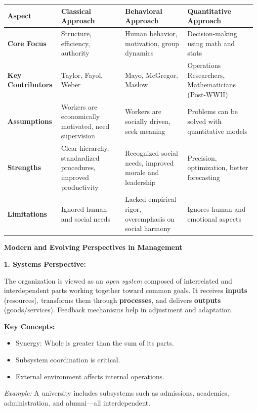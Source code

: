 \documentclass[12pt,a4paper]{book}
\begin{document}
\begin{tabular}{|p{4cm}|p{4cm}|p{4cm}|p{4cm}|}
\hline
\textbf{Aspect} & \textbf{Classical Approach} & \textbf{Behavioral Approach} & \textbf{Quantitative Approach} \\
\hline
\textbf{Core Focus} & Structure, efficiency, authority & Human behavior, motivation, group dynamics & Decision-making using math and stats \\
\hline
\textbf{Key Contributors} & Taylor, Fayol, Weber & Mayo, McGregor, Maslow & Operations Researchers, Mathematicians (Post-WWII) \\
\hline
\textbf{Assumptions} & Workers are economically motivated, need supervision & Workers are socially driven, seek meaning & Problems can be solved with quantitative models \\
\hline
\textbf{Strengths} & Clear hierarchy, standardized procedures, improved productivity & Recognized social needs, improved morale and leadership & Precision, optimization, better forecasting \\
\hline
\textbf{Limitations} & Ignored human and social needs & Lacked empirical rigor, overemphasis on social harmony & Ignores human and emotional aspects \\
\hline
\end{tabular}

\vspace{0.8cm}

\textbf{Modern and Evolving Perspectives in Management}

\textbf{1. Systems Perspective:}

The organization is viewed as an \textit{open system} composed of interrelated and interdependent parts working together toward common goals. It receives \textbf{inputs} (resources), transforms them through \textbf{processes}, and delivers \textbf{outputs} (goods/services). Feedback mechanisms help in adjustment and adaptation.

\textbf{Key Concepts:}
\begin{itemize}
    \item Synergy: Whole is greater than the sum of its parts.
    \item Subsystem coordination is critical.
    \item External environment affects internal operations.
\end{itemize}

\textit{Example:} A university includes subsystems such as admissions, academics, administration, and alumni—all interdependent.
\end{document}
